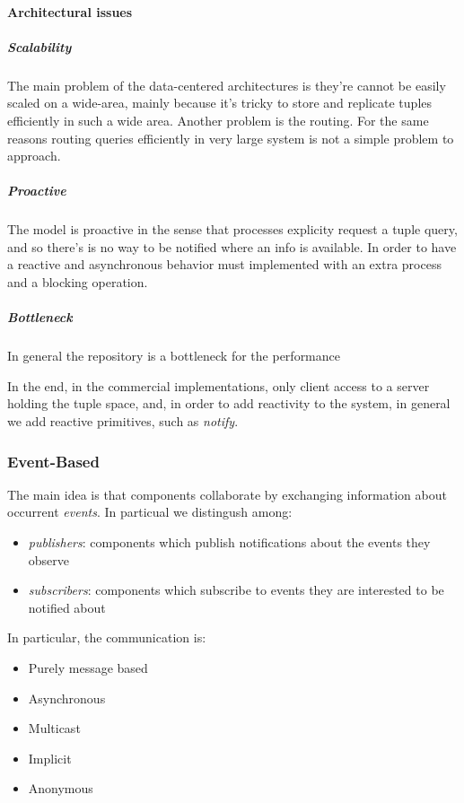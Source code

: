 \documentclass{article}
\begin{document}
    \paragraph{Architectural issues}
    \subparagraph{Scalability}
    The main problem of the data-centered architectures is they're cannot be easily scaled
    on a wide-area, mainly because it's tricky to store and replicate tuples efficiently in 
    such a wide area. Another problem is the routing. For the same reasons routing queries
    efficiently in very large system is not a simple problem to approach.
    \subparagraph{Proactive}
    The model is proactive in the sense that processes explicity request a tuple query,
    and so there's is no way to be notified where an info is available. In order to have a
    reactive and asynchronous behavior must implemented with an extra process and a
    blocking operation.
    \subparagraph{Bottleneck}
    In general the repository is a bottleneck for the performance

    In the end, in the commercial implementations, only client access to a server holding the
    tuple space, and, in order to add reactivity to the system, in general we add reactive
    primitives, such as \textit{notify}.

    \subsubsection{Event-Based}
    The main idea is that components collaborate by exchanging information about occurrent \textit{events}.
    In particual we distingush among:
    \begin{itemize}
        \item \textit{publishers}: components which publish notifications about the events they observe
        \item \textit{subscribers}: components which subscribe to events they are interested to be notified about
    \end{itemize}
    In particular, the communication is:
    \begin{itemize}
        \item Purely message based
        \item Asynchronous
        \item Multicast
        \item Implicit
        \item Anonymous
    \end{itemize}
\end{document}
